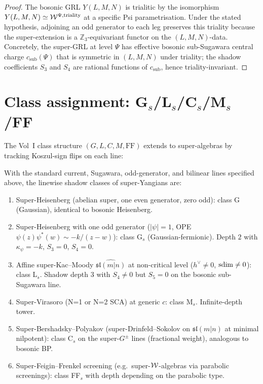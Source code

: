 \begin{proof}[Proof]
The bosonic GRL $Y(L, M, N)$ is trialitic by the isomorphism
$Y(L, M, N) \simeq \mathcal{W}^{\Psi, \mathrm{triality}}$ at a specific Psi
parametrisation. Under the stated hypothesis, adjoining an odd generator
to each leg preserves this triality because the super-extension is
a $\mathbb{Z}_3$-equivariant functor on the $(L, M, N)$-data. Concretely,
the super-GRL at level $\Psi$ has effective bosonic sub-Sugawara
central charge $c_{\mathrm{sub}}(\Psi)$ that is symmetric in $(L, M, N)$
under triality; the shadow coefficients $S_3$ and $S_4$ are rational
functions of $c_{\mathrm{sub}}$, hence triality-invariant.
\end{proof}

\section{Class assignment: G\texorpdfstring{$_s$}{-s}/L\texorpdfstring{$_s$}{-s}/C\texorpdfstring{$_s$}{-s}/M\texorpdfstring{$_s$}{-s}/FF}
\label{sec:super-riccati-class-assignment}

The Vol~I class structure $(G, L, C, M, \mathrm{FF})$ extends to
super-algebras by tracking Koszul-sign flips on each line:

\begin{theorem}
\label{thm:super-class-assignment}
With the standard current, Sugawara, odd-generator, and bilinear lines
specified above, the linewise shadow classes of super-Yangians are:
\begin{enumerate}[label=\textup{(\alph*)},nosep]
\item Super-Heisenberg (abelian super, one even generator, zero odd):
 class G (Gaussian), identical to bosonic Heisenberg.
\item Super-Heisenberg with one odd generator ($|\psi| = 1$, OPE
 $\psi(z) \psi^\ast(w) \sim -k/(z-w)$): class G$_s$
 (Gaussian-fermionic). Depth $2$ with $\kappa_\psi = -k$, $S_3 = 0$,
 $S_4 = 0$.
\item Affine super-Kac--Moody $\widehat{\mathfrak{sl}(m|n)}$ at non-critical
 level ($h^\vee \ne 0$, $\mathrm{sdim} \ne 0$): class L$_s$. Shadow depth
 $3$ with $S_4 \ne 0$ but $S_5 = 0$ on the bosonic sub-Sugawara line.
\item Super-Virasoro (N=1 or N=2 SCA) at generic $c$: class M$_s$.
 Infinite-depth tower.
\item Super-Bershadsky--Polyakov (super-Drinfeld--Sokolov on
 $\mathfrak{sl}(m|n)$ at minimal nilpotent): class C$_s$ on the
 super-$G^\pm$ lines (fractional weight), analogous to bosonic BP.
\item Super-Feigin--Frenkel screening (e.g.\ super-$\mathcal{W}$-algebras via
 parabolic screenings): class FF$_s$ with depth depending on the
 parabolic type.
\end{enumerate}
\end{theorem}

